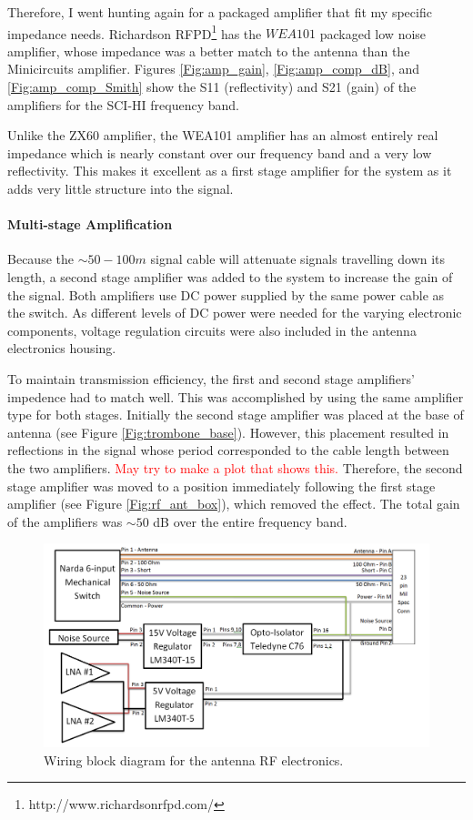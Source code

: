 Therefore, I went hunting again for a packaged amplifier that fit my specific impedance needs. Richardson RFPD\footnote{http://www.richardsonrfpd.com/} has the $WEA 101$ packaged low noise amplifier, whose impedance was a better match to the antenna than the Minicircuits amplifier. Figures \ref{Fig:amp_gain}, \ref{Fig:amp_comp_dB}, and \ref{Fig:amp_comp_Smith} show the S11 (reflectivity) and S21 (gain) of the amplifiers for the SCI-HI frequency band.

Unlike the ZX60 amplifier, the WEA101 amplifier has an almost entirely real impedance which is nearly constant over our frequency band and a very low reflectivity. This makes it excellent as a first stage amplifier for the system as it adds very little structure into the signal. 

\paragraph{Multi-stage Amplification}
Because the $\sim 50-100 m$ signal cable will attenuate signals travelling down its length, a second stage amplifier was added to the system to increase the gain of the signal. Both amplifiers use DC power supplied by the same power cable as the switch. As different levels of DC power were needed for the varying electronic components, voltage regulation circuits were also included in the antenna electronics housing. 

To maintain transmission efficiency, the first and second stage amplifiers' impedence had to match well. This was accomplished by using the same amplifier type for both stages. Initially the second stage amplifier was placed at the base of antenna (see Figure \ref{Fig:trombone_base}). However, this placement resulted in reflections in the signal whose period corresponded to the cable length between the two amplifiers. \textcolor{red}{May try to make a plot that shows this.} Therefore, the second stage amplifier was moved to a position immediately following the first stage amplifier (see Figure \ref{Fig:rf_ant_box}), which removed the effect. The total gain of the amplifiers was $\sim 50$ dB over the entire frequency band. 

\begin{figure}[htb]
\begin{center}
\includegraphics[width=0.9\linewidth]{SCIHI_system/figures/antenna_rf_power_block_diagram.png}
\caption{Wiring block diagram for the antenna RF electronics.}
\label{Fig:ant_RF_pow_block_diagram}
\end{center}
\end{figure}

